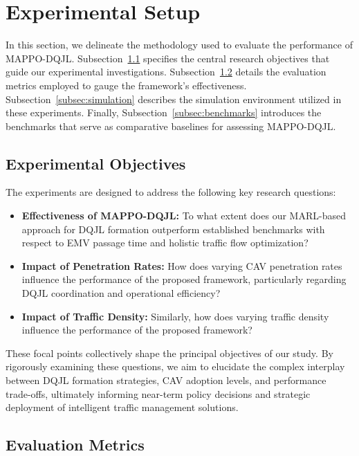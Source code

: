 \section{Experimental Setup}
\label{sec:experimental_setup}
In this section, we delineate the methodology used to evaluate the performance of MAPPO-DQJL. Subsection~\ref{subsec:objectives} specifies the central research objectives that guide our experimental investigations. Subsection~\ref{subsec:metrics} details the evaluation metrics employed to gauge the framework’s effectiveness. 
Subsection~\ref{subsec:simulation} describes the simulation environment utilized in these experiments. Finally, Subsection~\ref{subsec:benchmarks} introduces the benchmarks that serve as comparative baselines for assessing MAPPO-DQJL. 

\subsection{Experimental Objectives}
\label{subsec:objectives}

The experiments are designed to address the following key research questions:

\begin{itemize}
    \item \textbf{Effectiveness of MAPPO-DQJL:} To what extent does our MARL-based approach for DQJL formation outperform established benchmarks with respect to EMV passage time and holistic traffic flow optimization?
    \item \textbf{Impact of Penetration Rates:} How does varying CAV penetration rates influence the performance of the proposed framework, particularly regarding DQJL coordination and operational efficiency?
    \item \textbf{Impact of Traffic Density:} Similarly, how does varying traffic density influence the performance of the proposed framework?
\end{itemize}

These focal points collectively shape the principal objectives of our study. By rigorously examining these questions, we aim to elucidate the complex interplay between DQJL formation strategies, CAV adoption levels, and performance trade-offs, ultimately informing near-term policy decisions and strategic deployment of intelligent traffic management solutions.

\subsection{Evaluation Metrics}
\label{subsec:metrics}

